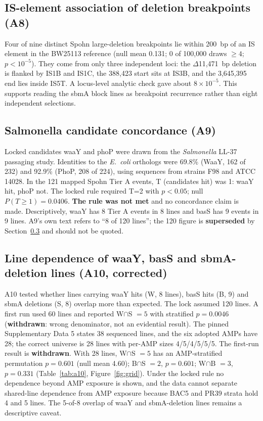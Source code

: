 \documentclass[11pt,letterpaper]{article}
\begin{document}
\subsection{IS-element association of deletion breakpoints (A8)}
Four of nine distinct Spohn large-deletion breakpoints lie within 200~bp of an IS element in the BW25113 reference (null mean 0.131; 0 of 100{,}000 draws $\ge4$; $p<10^{-5}$). They come from only three independent loci: the $\Delta$11{,}471~bp deletion is flanked by IS1B and IS1C, the 388{,}423 start sits at IS3B, and the 3{,}645{,}395 end lies inside IS5T. A locus-level analytic check gave about $8\times10^{-5}$. This supports reading the sbmA block lines as breakpoint recurrence rather than eight independent selections.

\subsection{Salmonella candidate concordance (A9)}
Locked candidates waaY and phoP were drawn from the \textit{Salmonella} LL-37 passaging study. Identities to the \textit{E.\ coli} orthologs were 69.8\% (WaaY, 162 of 232) and 92.9\% (PhoP, 208 of 224), using sequences from strains F98 and ATCC 14028. In the 121 mapped Spohn Tier A events, T (candidates hit) was 1: waaY hit, phoP not. The locked rule required T=2 with $p<0.05$; null $P(T\ge1)=0.0406$. \textbf{The rule was not met} and no concordance claim is made. Descriptively, waaY has 8 Tier A events in 8 lines and basS has 9 events in 9 lines. A9's own text refers to ``8 of 120 lines''; the 120 figure is \textbf{superseded} by Section~\ref{sec:a10} and should not be quoted.

\subsection{Line dependence of waaY, basS and sbmA-deletion lines (A10, corrected)}\label{sec:a10}
A10 tested whether lines carrying waaY hits (W, 8 lines), basS hits (B, 9) and sbmA deletions (S, 8) overlap more than expected. The lock assumed 120 lines. A first run used 60 lines and reported W$\cap$S $=5$ with stratified $p=0.0046$ (\textbf{withdrawn}: wrong denominator, not an evidential result). The pinned Supplementary Data 5 states 38 sequenced lines, and the six adopted AMPs have 28; the correct universe is 28 lines with per-AMP sizes 4/5/4/5/5/5. The first-run result is \textbf{withdrawn}. With 28 lines, W$\cap$S $=5$ has an AMP-stratified permutation $p=0.601$ (null mean 4.60); B$\cap$S $=2$, $p=0.601$; W$\cap$B $=3$, $p=0.331$ (Table~\ref{tab:a10}, Figure~\ref{fig:grid}). Under the locked rule no dependence beyond AMP exposure is shown, and the data cannot separate shared-line dependence from AMP exposure because BAC5 and PR39 strata hold 4 and 5 lines. The 5-of-8 overlap of waaY and sbmA-deletion lines remains a descriptive caveat.
\end{document}
